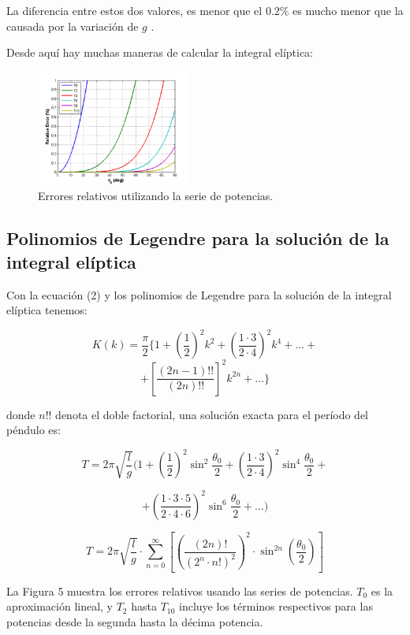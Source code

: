 \documentclass[DIV=calc, paper=a4, fontsize=12pt, twocolumn]{scrartcl}	 %
\begin{document}
La diferencia entre estos dos valores, es menor que el 0.2\% es mucho menor que la causada por la variación de $g$ .

Desde aquí hay muchas maneras de calcular la integral elíptica:

\begin{figure}[hb]
  \centering
  \includegraphics[width=2in]{pendulosimple5.png}
  \caption[Close up of \textit{Hemidactylus} sp.]
   {Errores relativos utilizando la serie de potencias. }
\end{figure}
\vspace{0.5cm}


\subsection*{Polinomios de Legendre para la solución de la integral elíptica}
\vspace{0.5cm}

Con la ecuación (2) y los polinomios de Legendre para la solución de la integral elíptica tenemos:

$$K(k)=\frac{\pi}{2}\{ 1 + (\frac{1}{2})^{2}k^{2} + (\frac{1\cdot 3}{2\cdot 4})^{2}k^{4} + \ldots + $$
$$+ [\frac{(2n-1)!!}{(2n)!!}]^{2}k^{2n} + \ldots \} $$

donde $n!!$ denota el doble factorial, una solución exacta para el período del péndulo es:

$$T=2\pi\sqrt{\frac{l}{g}}(1 + (\frac{1}{2})^{2}\sin^{2}{\frac{\theta_{0}}{2}} + (\frac{1\cdot3}{2\cdot4})^{2}\sin^{4}{\frac{\theta_{0}}{2}}+ $$

$$+ (\frac{1\cdot3\cdot5}{2\cdot4\cdot6})^{2}\sin^{6}{\frac{\theta_{0}}{2}}+ \ldots)$$

$$T=2\pi\sqrt{\frac{l}{g}}\cdot\sum_{n=0}^{\infty}[(\frac{(2n)!}{(2^{n}\cdot n!)^{2}})^{2}\cdot \sin^{2n}{(\frac{\theta_{0}}{2})}]$$

La Figura 5 muestra los errores relativos usando las series de potencias. $T_{0}$ es la aproximación lineal, y $T_{2}$ hasta $T_{10}$ incluye los términos respectivos para las potencias desde la segunda hasta la décima potencia.
\end{document}
